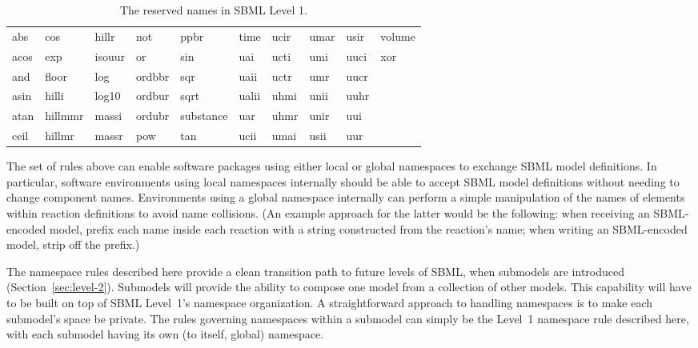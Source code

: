 \documentclass[10pt]{cekarticle}
\begin{document}
\begin{table}[tbh]
  \vspace*{-5pt}
  \centering
  \ttfamily
  \begin{tabular}{llllllllll}
    \toprule  
    abs	   & cos	& hillr   & not     & ppbr	& time	& ucir & umar	& usir	& volume\\
    acos   & exp	& isouur  & or 	    & sin	& uai	& ucti & umi	& uuci  & xor\\
    and    & floor	& log	  & ordbbr  & sqr	& uaii	& uctr & umr	& uucr \\
    asin   & hilli	& log10	  & ordbur  & sqrt	& ualii	& uhmi & unii	& uuhr \\
    atan   & hillmmr	& massi	  & ordubr  & substance	& uar	& uhmr & unir	& uui \\
    ceil   & hillmr	& massr	  & pow     & tan	& ucii	& umai & usii   & uur \\
    \bottomrule
  \end{tabular}
  \caption{The reserved names in SBML Level 1.}
  \label{tab:reserved-names}
\end{table}

The set of rules above can enable software packages using either local or
global namespaces to exchange SBML model definitions.  In particular,
software environments using local namespaces internally should be able to
accept SBML model definitions without needing to change component names.
Environments using a global namespace internally can perform a simple
manipulation of the names of elements within reaction definitions to avoid
name collisions.  (An example approach for the latter would be the
following: when receiving an SBML-encoded model, prefix each name inside
each reaction with a string constructed from the reaction's name; when
writing an SBML-encoded model, strip off the prefix.)

The namespace rules described here provide a clean transition path to
future levels of SBML, when submodels are introduced
(Section~\ref{sec:level-2}).  Submodels will provide the ability to compose
one model from a collection of other models.  This capability will have to
be built on top of SBML Level~1's namespace organization.  A
straightforward approach to handling namespaces is to make each submodel's
space be private.  The rules governing namespaces within a submodel can
simply be the Level~1 namespace rule described here, with each submodel
having its own (to itself, global) namespace.


\end{document}
